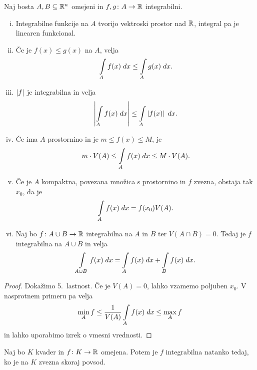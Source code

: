 \begin{izrek}
Naj bosta $A, B \subseteq \mathbb{R}^n$ omejeni in $f, g \colon A \to \mathbb{R}$
integrabilni.

\begin{enumerate}[i)]
\item Integrabilne funkcije na $A$ tvorijo vektroski prostor nad
$\mathbb{R}$, integral pa je linearen funkcional.
\item Če je $f(x) \leq g(x)$ na $A$, velja
\[
\int\limits_A f(x)\;dx \leq \int\limits_A g(x)\;dx.
\]
\item $\left\lvert f\right\rvert$ je integrabilna in velja
\[
\left\lvert \int\limits_A f(x)\;dx\right\rvert \leq \int\limits_A \left\lvert f(x)\right\rvert\;dx.
\]
\item Če ima $A$ prostornino in je $m \leq f(x) \leq M$, je
\[
m \cdot V(A) \leq \int\limits_A f(x)\;dx \leq M \cdot V(A).
\]
\item Če je $A$ kompaktna, povezana množica s prostornino in $f$
zvezna, obstaja tak $x_0$, da je
\[
\int\limits_A f(x)\;dx = f(x_0) V(A).
\]
\item Naj bo $f \colon A \cup B \to \mathbb{R}$ integrabilna na $A$ in $B$
ter $V(A \cap B) = 0$. Tedaj je $f$ integrabilna na $A \cup B$ in
velja
\[
\int\limits_{A \cup B} f(x)\;dx = \int\limits_A f(x)\;dx + \int\limits_B f(x)\;dx.
\]
\end{enumerate} 
\end{izrek}

\begin{proof}
Dokažimo 5.\ lastnost. Če je $V(A) = 0$, lahko vzamemo poljuben
$x_0$. V nasprotnem primeru pa velja
\[
\min_A f \leq \frac{1}{V(A)} \int\limits_A f(x)\;dx \leq \max_A f
\]
in lahko uporabimo izrek o vmesni vrednosti.
\end{proof}

\begin{izrek}[Lebesgue]
Naj bo $K$ kvader in $f \colon K \to \mathbb{R}$ omejena. Potem je $f$
integrabilna natanko tedaj, ko je na $K$ zvezna skoraj povsod.
\end{izrek}

